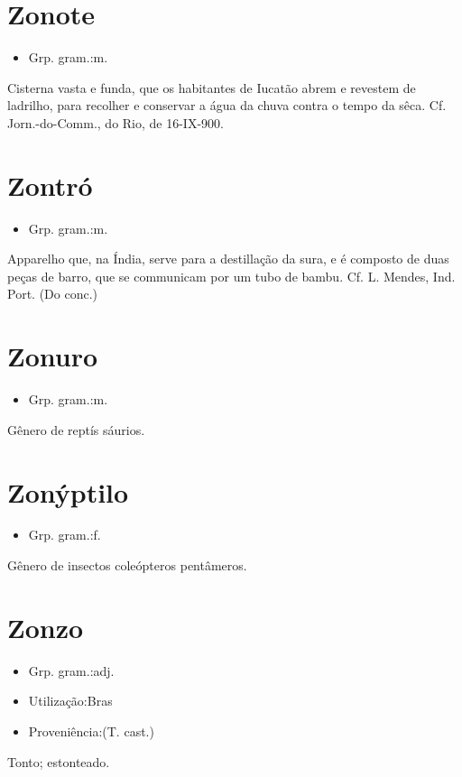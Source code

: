 \section{Zonote}
\begin{itemize}
\item {Grp. gram.:m.}
\end{itemize}
Cisterna vasta e funda, que os habitantes de Iucatão abrem e revestem de ladrilho, para recolher e conservar a água da chuva contra o tempo da sêca. Cf. \textunderscore Jorn.-do-Comm.\textunderscore , do Rio, de 16-IX-900.
\section{Zontró}
\begin{itemize}
\item {Grp. gram.:m.}
\end{itemize}
Apparelho que, na Índia, serve para a destillação da sura, e é composto de duas peças de barro, que se communicam por um tubo de bambu. Cf. L. Mendes, \textunderscore Ind. Port.\textunderscore 
(Do conc.)
\section{Zonuro}
\begin{itemize}
\item {Grp. gram.:m.}
\end{itemize}
Gênero de reptís sáurios.
\section{Zonýptilo}
\begin{itemize}
\item {Grp. gram.:f.}
\end{itemize}
Gênero de insectos coleópteros pentâmeros.
\section{Zonzo}
\begin{itemize}
\item {Grp. gram.:adj.}
\end{itemize}
\begin{itemize}
\item {Utilização:Bras}
\end{itemize}
\begin{itemize}
\item {Proveniência:(T. cast.)}
\end{itemize}
Tonto; estonteado.
